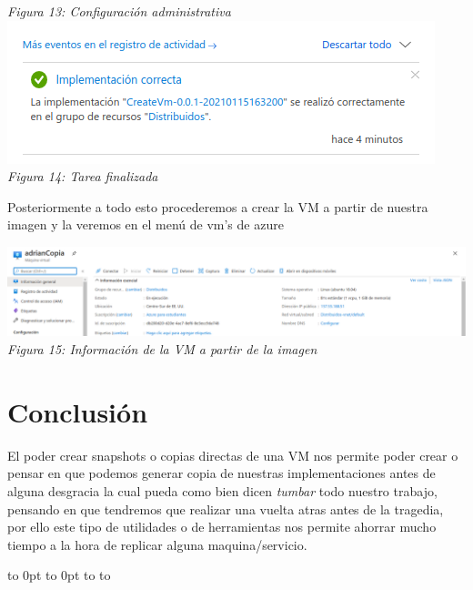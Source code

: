 \documentclass[10pt,executivepaper]{article}
\def\fillandplacepagenumber{%
 \par\pagestyle{empty}%
 \vbox to 0pt{\vss}\vfill
 \vbox to 0pt{\baselineskip0pt
   \hbox to\linewidth{\hss}%
   \baselineskip\footskip
   \hbox to\linewidth{%
     \hfil\thepage\hfil}\vss}}
\begin{document}
\begin{center}
  \textit{Figura 13: Configuración administrativa}\\
  \includegraphics[scale=0.5]{imgs/14.png}\\
  \textit{Figura 14: Tarea finalizada}
\end{center}
Posteriormente a todo esto procederemos a crear la VM a partir de nuestra imagen y la veremos en el menú de vm's de azure
\begin{landscape}
  \begin{center}
    \includegraphics[scale=0.45]{imgs/15.png}\\
    \textit{Figura 15: Información de la VM a partir de la imagen}
  \end{center}
  \section{Conclusión}
  El poder crear snapshots o copias directas de una VM nos permite poder crear o pensar en que podemos generar copia de nuestras implementaciones antes de alguna desgracia la cual pueda como bien dicen \textit{tumbar} todo nuestro trabajo, pensando en que tendremos que realizar una vuelta atras antes de la tragedia, por ello este tipo de utilidades o de herramientas nos permite ahorrar mucho tiempo a la hora de replicar alguna maquina/servicio.
  \fillandplacepagenumber
\end{landscape}
\end{document}
